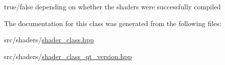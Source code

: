 true/false depending on whether the shaders were successfully compiled 

The documentation for this class was generated from the following files\+:\begin{DoxyCompactItemize}
\item 
src/shaders/\mbox{\hyperlink{shader__class_8hpp}{shader\+\_\+class.\+hpp}}\item 
src/shaders/\mbox{\hyperlink{shader__class__qt__version_8hpp}{shader\+\_\+class\+\_\+qt\+\_\+version.\+hpp}}\end{DoxyCompactItemize}
